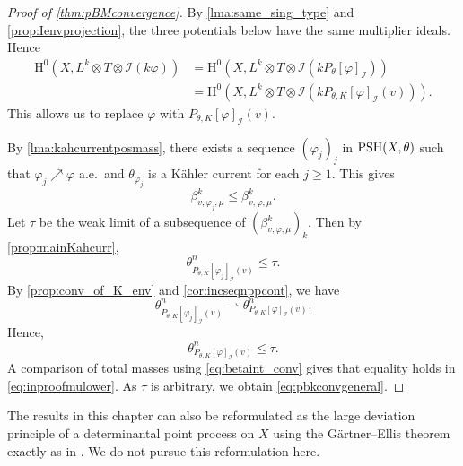 \begin{proof}[Proof of \cref{thm:pBMconvergence}]
By \cref{lma:same_sing_type} and \cref{prop:Ienvprojection}, the three potentials below have the same multiplier ideals. Hence
\[
\begin{aligned}
\mathrm{H}^0\left(X,L^k \otimes T \otimes \mathcal{I}(k\varphi)\right) &= \mathrm{H}^0\left(X,L^k \otimes T \otimes \mathcal I(kP_{\theta}[\varphi]_{\mathcal{I}})\right)\\
 &= \mathrm{H}^0\left(X,L^k \otimes T \otimes \mathcal I\left(kP_{\theta,K}[\varphi]_{\mathcal{I}}(v)\right)\right).
 \end{aligned}
\]
This allows us to replace $\varphi$ with $P_{\theta,K}[\varphi]_{\mathcal{I}}(v)$.


By \cref{lma:kahcurrentposmass}, there exists a sequence $(\varphi_j)_j$ in $\mathrm{PSH}(X,\theta)$ such that $\varphi_j\nearrow \varphi$ a.e.\ and $\theta_{\varphi_j}$ is a Kähler current for each $j\geq 1$. This gives
\[
\beta^k_{v,\varphi_j,\mu} \leq \beta^k_{v,\varphi,\mu}.
\]
Let $\tau$ be the weak limit of a subsequence of $(\beta^k_{v,\varphi,\mu})_k$. Then by \cref{prop:mainKahcurr},
\[
\theta_{P_{\theta,K} [\varphi_j]_{\mathcal{I}}(v)}^n\leq \tau.
\]
By \cref{prop:conv_of_K_env} and \cref{cor:incseqnppcont}, we have
\[
\theta_{P_{\theta,K} [\varphi_j]_{\mathcal{I}}(v)}^n \rightharpoonup \theta_{P_{\theta,K} [\varphi]_{\mathcal{I}}(v)}^n.
\]
Hence,
\begin{equation}\label{eq:inproofmulower}
\theta_{P_{\theta,K} [\varphi]_{\mathcal{I}}(v)}^n\leq \tau.
\end{equation}
A comparison of total masses using \eqref{eq:betaint_conv} gives that equality holds in \eqref{eq:inproofmulower}. As $\tau$ is arbitrary, we obtain \eqref{eq:pbkconvgeneral}.
\end{proof}

\begin{remark}\label{rmk:Bergman:L1290}
    The results in this chapter can also be reformulated as the large deviation principle of a determinantal point process on $X$ using the Gärtner--Ellis theorem exactly as in \cite{Ber14}. We do not pursue this reformulation here.
\end{remark}
